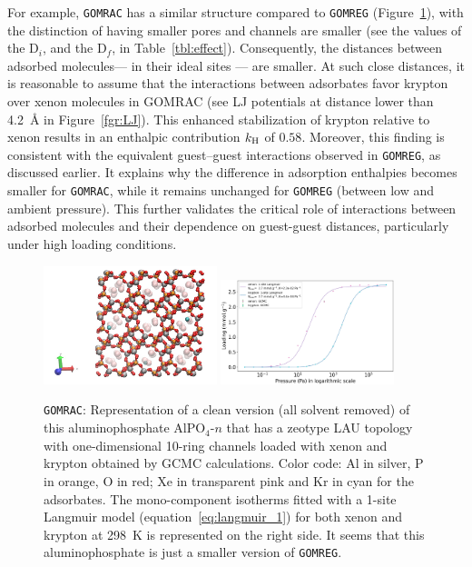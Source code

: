 \documentclass[main.tex]{subfiles}
\begin{document}
For example, \texttt{GOMRAC} has a similar structure compared to \texttt{GOMREG} (Figure~\ref{fgr:SI:examples:GOMRAC}), with the distinction of having smaller pores and channels are smaller (see the values of the D$_i$, and the D$_f$, in Table~\ref{tbl:effect}). Consequently, the distances between adsorbed molecules--- in their ideal sites ---  are smaller. At such close distances, it is reasonable to assume that the interactions between adsorbates favor krypton over xenon molecules in GOMRAC (see LJ potentials at distance lower than \SI{4.2}{\angstrom} in Figure~\ref{fgr:LJ}). This enhanced stabilization of krypton relative to xenon results in an enthalpic contribution $k_{\text{H}}$ of $0.58$. Moreover, this finding is consistent with the equivalent guest--guest interactions observed in \texttt{GOMREG}, as discussed earlier. It explains why the difference in adsorption enthalpies becomes smaller for \texttt{GOMRAC}, while it remains unchanged for \texttt{GOMREG} (between low and ambient pressure). This further validates the critical role of interactions between adsorbed molecules and their dependence on guest-guest distances, particularly under high loading conditions.

\begin{figure}[ht]
  \centering
    \includegraphics[width=0.45\textwidth]{figures/2-thermo/GOMRAC_clean.jpg}
    \includegraphics[width=0.45\textwidth]{figures/2-thermo/GOMRAC_clean_isotherm_xenon_krypton_298K.jpg}
    \caption{\texttt{GOMRAC}: Representation of a clean version (all solvent removed) of this aluminophosphate AlPO$_4$-$n$ that has a zeotype LAU topology with one-dimensional 10-ring channels loaded with xenon and krypton obtained by GCMC calculations. Color code: Al in silver, P in orange, O in red; Xe in transparent pink and Kr in cyan for the adsorbates. The mono-component isotherms fitted with a 1-site Langmuir model (equation~\ref{eq:langmuir_1}) for both xenon and krypton at \SI{298}{\kelvin} is represented on the right side. It seems that this aluminophosphate is just a smaller version of \texttt{GOMREG}.}\label{fgr:SI:examples:GOMRAC}
  \end{figure}
\end{document}
